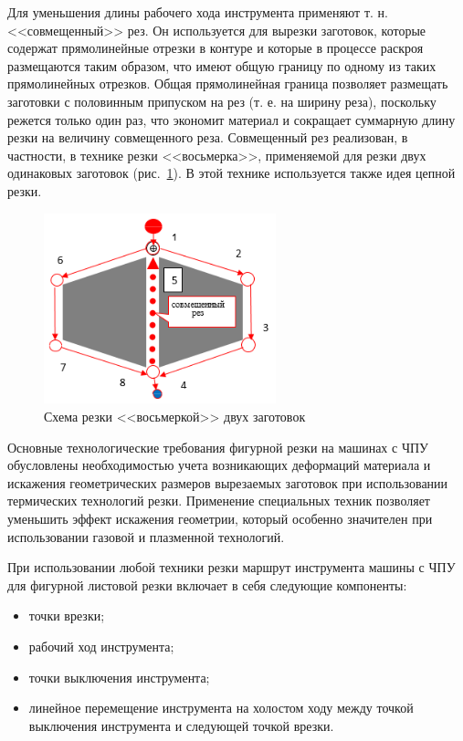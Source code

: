 \documentclass[11pt,twoside,openany]{report}
\begin{document}
Для уменьшения длины рабочего хода инструмента
применяют т. н. <<совмещенный>> рез.
Он используется для вырезки заготовок,
которые содержат прямолинейные отрезки в контуре
и которые в процессе раскроя размещаются таким образом,
что имеют общую границу по одному из таких прямолинейных отрезков.
Общая прямолинейная граница позволяет размещать
заготовки с половинным припуском на рез
(т. е. на ширину реза),
поскольку режется только один раз,
что экономит материал и сокращает суммарную
длину резки на величину совмещенного реза.
Совмещенный рез реализован, в частности,
в технике резки <<восьмерка>>,
применяемой для резки двух одинаковых заготовок
(рис.~\ref{8}).
В этой технике используется также идея цепной резки.

\begin{figure}[h]
  \begin{center}
  \includegraphics[width=0.6\textwidth]{8.png}
  \caption{Схема резки <<восьмеркой>> двух заготовок}
  \label{8}
  \end{center}
\end{figure}

Основные технологические требования
фигурной резки на машинах с ЧПУ обусловлены
необходимостью учета возникающих деформаций
материала и искажения геометрических размеров
вырезаемых заготовок при использовании
термических технологий резки.
Применение специальных техник позволяет
уменьшить эффект искажения геометрии,
который особенно значителен при
использовании газовой и плазменной технологий.

При использовании любой техники резки маршрут инструмента
машины с ЧПУ для фигурной листовой резки
включает в себя следующие компоненты:
\begin{itemize}
  \item точки врезки;
  \item рабочий ход инструмента;
  \item точки выключения инструмента;
  \item линейное перемещение инструмента на холостом ходу
  между точкой выключения инструмента и следующей точкой врезки.
\end{itemize}
\end{document}
